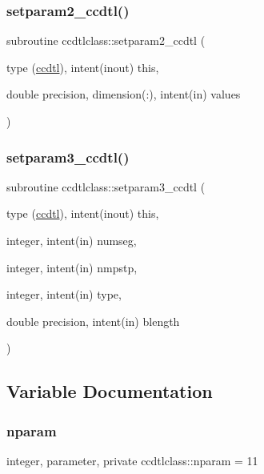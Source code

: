 \subsubsection{\texorpdfstring{setparam2\_ccdtl()}{setparam2\_ccdtl()}}
{\footnotesize\ttfamily subroutine ccdtlclass\+::setparam2\+\_\+ccdtl (\begin{DoxyParamCaption}\item[{type (\mbox{\hyperlink{namespaceccdtlclass_structccdtlclass_1_1ccdtl}{ccdtl}}), intent(inout)}]{this,  }\item[{double precision, dimension(\+:), intent(in)}]{values }\end{DoxyParamCaption})}

\mbox{\label{namespaceccdtlclass_a3632b0f42925964cedb7778792da563f}} 
\subsubsection{\texorpdfstring{setparam3\_ccdtl()}{setparam3\_ccdtl()}}
{\footnotesize\ttfamily subroutine ccdtlclass\+::setparam3\+\_\+ccdtl (\begin{DoxyParamCaption}\item[{type (\mbox{\hyperlink{namespaceccdtlclass_structccdtlclass_1_1ccdtl}{ccdtl}}), intent(inout)}]{this,  }\item[{integer, intent(in)}]{numseg,  }\item[{integer, intent(in)}]{nmpstp,  }\item[{integer, intent(in)}]{type,  }\item[{double precision, intent(in)}]{blength }\end{DoxyParamCaption})}



\subsection{Variable Documentation}
\mbox{\label{namespaceccdtlclass_a0e8e95c86f2dab6639fc79f05859b6ea}} 
\subsubsection{\texorpdfstring{nparam}{nparam}}
{\footnotesize\ttfamily integer, parameter, private ccdtlclass\+::nparam = 11\hspace{0.3cm}{\ttfamily [private]}}

